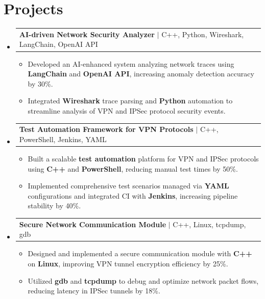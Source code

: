 \documentclass[letterpaper,11pt]{article}
\makeatletter
\newcommand{\resumeItem}[1]{
  \item\footnotesize{
    {#1 \vspace{-2pt}}
  }
}
\newcommand{\resumeProjectHeading}[2]{
    \item
    \begin{tabular*}{1.001\textwidth}{l@{\extracolsep{\fill}}r}
      \small#1 & \textbf{\small #2}\\
    \end{tabular*}\vspace{-7pt}
}
\newcommand{\resumeSubHeadingListStart}{\begin{itemize}[leftmargin=0pt, label={}]}
\newcommand{\resumeSubHeadingListEnd}{\end{itemize}}
\newcommand{\resumeItemListStart}{\begin{itemize}[leftmargin=*]}
\newcommand{\resumeItemListEnd}{\end{itemize}\vspace{-5pt}}
\makeatother
\begin{document}
\section{Projects}
    \vspace{-5pt}
    \resumeSubHeadingListStart

      \resumeProjectHeading
          {\textbf{AI-driven Network Security Analyzer} $|$ C++, Python, Wireshark, LangChain, OpenAI API}{ }
        \resumeItemListStart
            \resumeItem{Developed an AI-enhanced system analyzing network traces using \textbf{LangChain} and \textbf{OpenAI API}, increasing anomaly detection accuracy by 30\%.}
            \resumeItem{Integrated \textbf{Wireshark} trace parsing and \textbf{Python} automation to streamline analysis of VPN and IPSec protocol security events.}
        \resumeItemListEnd
        \vspace{-12pt}

      \resumeProjectHeading
          {\textbf{Test Automation Framework for VPN Protocols} $|$ C++, PowerShell, Jenkins, YAML}{ }
        \resumeItemListStart
            \resumeItem{Built a scalable \textbf{test automation} platform for VPN and IPSec protocols using \textbf{C++} and \textbf{PowerShell}, reducing manual test times by 50\%.}
            \resumeItem{Implemented comprehensive test scenarios managed via \textbf{YAML} configurations and integrated CI with \textbf{Jenkins}, increasing pipeline stability by 40\%.}
        \resumeItemListEnd
        \vspace{-12pt}

      \resumeProjectHeading
          {\textbf{Secure Network Communication Module} $|$ C++, Linux, tcpdump, gdb}{ }
        \resumeItemListStart
            \resumeItem{Designed and implemented a secure communication module with \textbf{C++} on \textbf{Linux}, improving VPN tunnel encryption efficiency by 25\%.}
            \resumeItem{Utilized \textbf{gdb} and \textbf{tcpdump} to debug and optimize network packet flows, reducing latency in IPSec tunnels by 18\%.}
        \resumeItemListEnd

    \resumeSubHeadingListEnd
\end{document}
